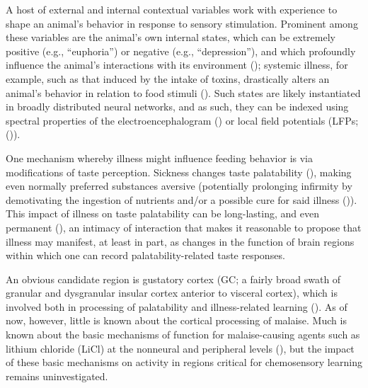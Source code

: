 \begin{refsection}
A host of external and internal contextual variables work with experience to shape an animal’s behavior in response to sensory stimulation. Prominent among these variables are the animal’s own internal states, which can be extremely positive (e.g., “euphoria”) or negative (e.g., “depression”), and which profoundly influence the animal’s interactions with its environment (\cite{livneh2020a}); systemic illness, for example, such as that induced by the intake of toxins, drastically alters an animal’s behavior in relation to food stimuli (\cite{parker1982a,nachman1963a,nachman1973a}). Such states are likely instantiated in broadly distributed neural networks, and as such, they can be indexed using spectral properties of the electroencephalogram (\cite{loefhede2010a,li-a}) or local field potentials (LFPs; (\cite{okonogi2018a,kelly2010a})).

One mechanism whereby illness might influence feeding behavior is via modifications of taste perception. Sickness changes taste palatability (\cite{aubert1999a,aubert2005a}), making even normally preferred substances aversive (potentially prolonging infirmity by demotivating the ingestion of nutrients and/or a possible cure for said illness (\cite{provenza1995a})). This impact of illness on taste palatability can be long-lasting, and even permanent (\cite{garcia1974a}), an intimacy of interaction that makes it reasonable to propose that illness may manifest, at least in part, as changes in the function of brain regions within which one can record palatability-related taste responses.

An obvious candidate region is gustatory cortex (GC; a fairly broad swath of granular and dysgranular insular cortex anterior to visceral cortex), which is involved both in processing of palatability and illness-related learning (\cite{flores2018a,lin2014a}). As of now, however, little is known about the cortical processing of malaise. Much is known about the basic mechanisms of function for malaise-causing agents such as lithium chloride (LiCl) at the nonneural and peripheral levels (\cite{parker1982a,nachman1963a,nachman1973a,cloutier2012a,cloutier2012b,cloutier2017a,zhang2021a,nachman1975a}), but the impact of these basic mechanisms on activity in regions critical for chemosensory learning remains uninvestigated.


\end{refsection}
